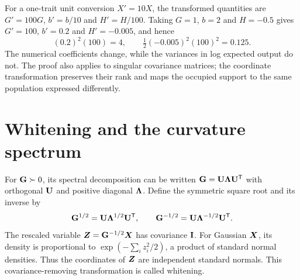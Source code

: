 For a one-trait unit conversion $X'=10X$, the transformed quantities are
$G'=100G$, $b'=b/10$ and $H'=H/100$. Taking $G=1$, $b=2$ and $H=-0.5$
gives $G'=100$, $b'=0.2$ and $H'=-0.005$, and hence
\[
(0.2)^2(100)=4,\qquad
\tfrac12(-0.005)^2(100)^2=0.125.
\]
The numerical coefficients change, while the variances in log expected
output do not. The proof also applies to singular covariance matrices;
the coordinate transformation preserves their rank and maps the occupied
support to the same population expressed differently.

\section{Whitening and the curvature spectrum}
\label{geometry:whitening}

For $\mathbf{G}\succ0$, its spectral decomposition can be written
$\mathbf{G}=\mathbf{U}\mathbf{\Lambda}\mathbf{U}^{\mathsf T}$ with orthogonal
$\mathbf{U}$ and positive diagonal $\mathbf{\Lambda}$. Define the symmetric
square root and its inverse by
\[
\mathbf{G}^{1/2}=\mathbf{U}\mathbf{\Lambda}^{1/2}\mathbf{U}^{\mathsf T},
\qquad
\mathbf{G}^{-1/2}=\mathbf{U}\mathbf{\Lambda}^{-1/2}\mathbf{U}^{\mathsf T}.
\]
The rescaled variable $\boldsymbol{Z}=\mathbf{G}^{-1/2}\boldsymbol{X}$ has covariance
$\mathbf{I}$. For Gaussian $\boldsymbol{X}$, its density is proportional to
$\exp(-\sum_i z_i^2/2)$, a product of standard normal densities.
Thus the coordinates of $\boldsymbol{Z}$ are independent standard normals.
This covariance-removing transformation is called whitening.

